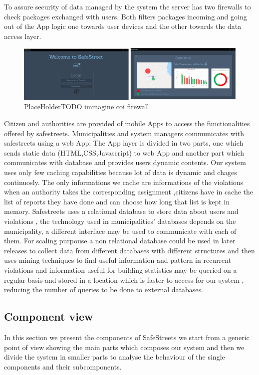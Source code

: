 To assure security of data managed by the system the server has two firewalls to check packages exchanged with users. Both filters packages incoming and going out of the App logic one towards user devices and the other towards the data access layer.
\begin{figure}[H]
\centering
\includegraphics[width=\textwidth]{Images/desktop_common_interface.png}
\caption{\label{fig:ComWI}PlaceHolderTODO immagine coi firewall}
\end{figure}
Citizen and authorities are provided of mobile Apps to access the functionalities offered by safestreets. Municipalities and system managers communicates with safestreets using a web App.
The App layer is divided in two parts, one which sends static data (HTML,CSS,Javascript) to web App and another part which communicates with database and provides users dynamic contents.
Our system uses only few caching capabilities because lot of data is dynamic and chages continuosly. The only informations we cache are informations of the violations when an authority takes the corresponding assignment ,citizens have in cache the list of reports they have done and can choose how long that list is kept in memory.
Safestreets uses a relational database to store data about users and violations , the technology used in municipalities' databases depends on the municipality, a different interface may be used to communicate with each of them. For scaling purpouse a non relational database could be used in later releases to collect data from different databases with different structures and then uses mining techniques to find useful information and pattern in recurrent violations and information useful for building statistics may be queried on a regular basis and stored in a location which is faster to access for our system , reducing the number of queries to be done to external databases. 


\subsection{Component view}
In this section we present the components of SafeStreets we start from a generic point of view showing the main parts which composes our system and then we divide the system in smaller parts to analyse the behaviour of the single components and their subcomponents.
